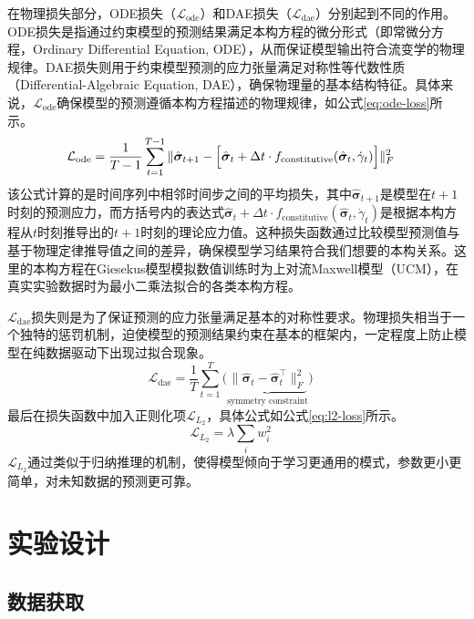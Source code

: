 在物理损失部分，ODE损失（$\mathcal{L}_{\text{ode}}$）和DAE损失（$\mathcal{L}_{\text{dae}}$）分别起到不同的作用。ODE损失是指通过约束模型的预测结果满足本构方程的微分形式（即常微分方程，Ordinary Differential Equation, ODE），从而保证模型输出符合流变学的物理规律。DAE损失则用于约束模型预测的应力张量满足对称性等代数性质（Differential-Algebraic Equation, DAE），确保物理量的基本结构特征。具体来说，$\mathcal{L}_{\text{ode}}$确保模型的预测遵循本构方程描述的物理规律，如公式\ref{eq:ode-loss}所示。
\begin{equation}
  \mathcal{L}_{\text{ode}} = \frac{1}{T-1} \sum_{t=1}^{T-1}
  \|\hat{\bm{\sigma}}_{t+1} - \Bigl[
    \hat{\bm{\sigma}}_t + \Delta t \cdot
    f_{\text{constitutive}}(\hat{\bm{\sigma}}_t, \dot{\gamma}_t)
    \Bigr] \|_F^2
  \quad \label{eq:ode-loss}
\end{equation}
该公式计算的是时间序列中相邻时间步之间的平均损失，其中$\hat{\bm{\sigma}}_{t+1}$是模型在$t+1$时刻的预测应力，而方括号内的表达式$\hat{\bm{\sigma}}_t + \Delta t \cdot f_{\text{constitutive}}(\hat{\bm{\sigma}}_t, \dot{\gamma}_t)$是根据本构方程从$t$时刻推导出的$t+1$时刻的理论应力值。这种损失函数通过比较模型预测值与基于物理定律推导值之间的差异，确保模型学习结果符合我们想要的本构关系。这里的本构方程在Giesekus模型模拟数值训练时为上对流Maxwell模型（UCM），在真实实验数据时为最小二乘法拟合的各类本构方程。

$\mathcal{L}_{\text{dae}}$损失则是为了保证预测的应力张量满足基本的对称性要求。物理损失相当于一个独特的惩罚机制，迫使模型的预测结果约束在基本的框架内，一定程度上防止模型在纯数据驱动下出现过拟合现象。
\begin{equation}
  \mathcal{L}_{\text{dae}} = \frac{1}{T} \sum_{t=1}^T \Biggl(
  \underbrace{\|\hat{\bm{\sigma}}_t - \hat{\bm{\sigma}}_t^\top\|_F^2}_{\text{symmetry constraint}}
  \Biggr)
  \quad \label{eq:dae-loss}
\end{equation}
最后在损失函数中加入正则化项$\mathcal{L}_{L_{2}}$，具体公式如公式\ref{eq:l2-loss}所示。
\begin{equation}
  \mathcal{L}_{L_{2}} = \lambda \sum_{i} w_i^2
  \quad \label{eq:l2-loss}
\end{equation}
$\mathcal{L}_{L_{2}}$通过类似于归纳推理的机制，使得模型倾向于学习更通用的模式，参数更小更简单，对未知数据的预测更可靠。

\section{实验设计}
\subsection{数据获取}

